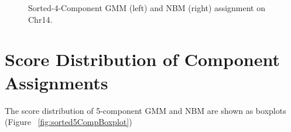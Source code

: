 \documentclass{article}\usepackage[]{graphicx}\usepackage[]{color}
\begin{document}
\begin{figure}[H]
    \centering
    \caption{Sorted-4-Component GMM (left) and NBM (right) assignment on Chr14.}
    \label{fig:Sorted4CompGenomicLocation}
\end{figure}
\clearpage

\section{Score Distribution of Component Assignments}

The score distribution of 5-component GMM and NBM are shown as boxplots (Figure ~\ref{fig:sorted5CompBoxplot})
\end{document}
